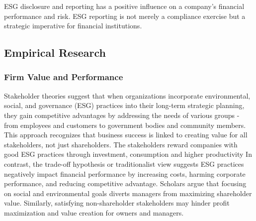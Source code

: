 \documentclass[
  authoryear]{elsarticle}
\begin{document}
ESG disclosure and reporting has a positive influence on a company's
financial performance and risk. ESG reporting is not merely a compliance
exercise but a strategic imperative for financial institutions.

\subsection{Empirical Research}\label{empirical-research}

\subsubsection{Firm Value and
Performance}\label{firm-value-and-performance}

Stakeholder theories \citep[see][]{FREEMAN1984, DEEGAN2002} suggest that
when organizations incorporate environmental, social, and governance
(ESG) practices into their long-term strategic planning, they gain
competitive advantages by addressing the needs of various groups - from
employees and customers to government bodies and community members. This
approach recognizes that business success is linked to creating value
for all stakeholders, not just shareholders. The stakeholders reward
companies with good ESG practices through investment, consumption and
higher productivity \citep{LI2018}In contrast, the trade-off hypothesis
or traditionalist view \citep[see][]{FRIEDMAN2007} suggests ESG
practices negatively impact financial performance by increasing costs,
harming corporate performance, and reducing competitive advantage.
Scholars argue that focusing on social and environmental goals diverts
managers from maximizing shareholder value. Similarly, satisfying
non-shareholder stakeholders may hinder profit maximization and value
creation for owners and managers\citep{GALANT2017}.
\end{document}
